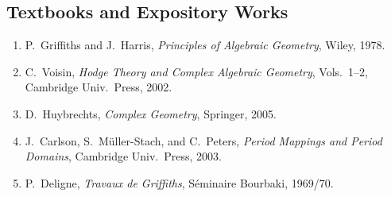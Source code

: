\subsection*{Textbooks and Expository Works}
\begin{enumerate}
    \item P.\ Griffiths and J.\ Harris, \textit{Principles of Algebraic Geometry}, Wiley, 1978.
    \item C.\ Voisin, \textit{Hodge Theory and Complex Algebraic Geometry}, Vols.\ 1--2, Cambridge Univ.\ Press, 2002.
    \item D.\ Huybrechts, \textit{Complex Geometry}, Springer, 2005.
    \item J.\ Carlson, S.\ M\"uller-Stach, and C.\ Peters, \textit{Period Mappings and Period Domains}, Cambridge Univ.\ Press, 2003.
    \item P.\ Deligne, \textit{Travaux de Griffiths}, S\'eminaire Bourbaki, 1969/70.
\end{enumerate}

